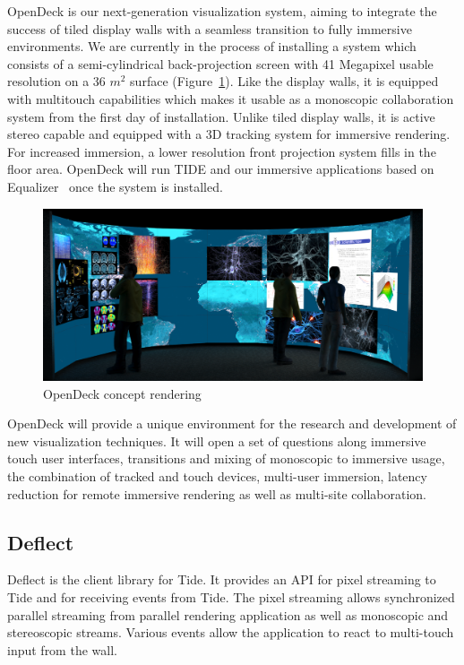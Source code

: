 \documentclass[10pt]{llncs}
\newcommand{\fig}[1]{Figure~\ref{#1}}
\begin{document}
OpenDeck is our next-generation visualization system, aiming to integrate the
success of tiled display walls with a seamless transition to fully immersive
environments. We are currently in the process of installing a system which
consists of a semi-cylindrical back-projection screen with 41 Megapixel usable
resolution on a 36 $m^2$ surface (\fig{fOpenDeck}). Like the display walls, it
is equipped with multitouch capabilities which makes it usable as a monoscopic
collaboration system from the first day of installation. Unlike tiled display
walls, it is active stereo capable and equipped with a 3D tracking system for
immersive rendering. For increased immersion, a lower resolution front
projection system fills in the floor area. OpenDeck will run TIDE and our
immersive applications based on Equalizer~\cite{EMP:09} once the system is
installed.

\begin{figure}[h!t]
  \includegraphics[width=\columnwidth]{images/opendeck}
  \caption{\label{fOpenDeck}OpenDeck concept rendering}
\end{figure}

OpenDeck will provide a unique environment for the research and development of
new visualization techniques. It will open a set of questions along immersive
touch user interfaces, transitions and mixing of monoscopic to immersive usage,
the combination of tracked and touch devices, multi-user immersion, latency
reduction for remote immersive rendering as well as multi-site collaboration.

\subsection{Deflect}

Deflect is the client library for Tide. It provides an API for pixel streaming
to Tide and for receiving events from Tide. The pixel streaming allows
synchronized parallel streaming from parallel rendering application as well as
monoscopic and stereoscopic streams. Various events allow the application to
react to multi-touch input from the wall.
\end{document}

